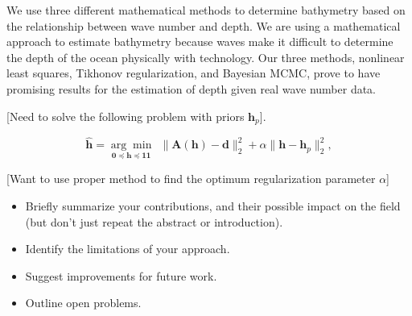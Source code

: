We use three different mathematical methods to determine bathymetry based on the relationship between wave number and depth. We are using a mathematical approach to estimate bathymetry because waves make it difficult to determine the depth of the ocean physically with technology. Our three methods, nonlinear least squares, Tikhonov regularization, and Bayesian MCMC, prove to have promising results for the estimation of depth given real wave number data. 


[Need to solve the following problem with priors $\mathbf{h}_p$].

\begin{equation}\label{LS-regBC}
\mathbf{\hat{h}} = \underset{\mathbf{0} \preceq \mathbf{h} \preceq \mathbf{11}}{\arg \min} \ \ \|  \mathbf{A}(\mathbf{h}) -  \mathbf{d} \|_2^2  +  \alpha \| \mathbf{h} -  \mathbf{h}_p\|_2^2,
\end{equation}

[Want to use proper method to find the optimum regularization parameter $\alpha$]

\begin{itemize}
\item Briefly summarize your contributions, and their possible
impact on the field (but don't just repeat the abstract or introduction).
\item Identify the limitations of your approach.
\item Suggest improvements for future work.
\item Outline open problems.
\end{itemize}

